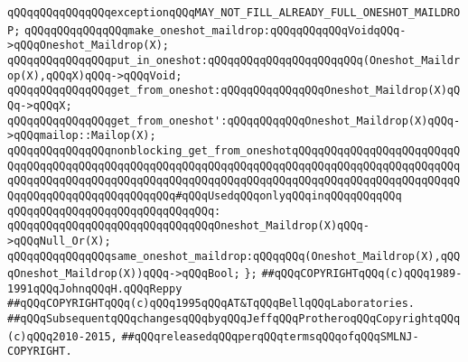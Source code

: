 \newline
\verb|qQQqqQQqqQQqqQQqexceptionqQQqMAY_NOT_FILL_ALREADY_FULL_ONESHOT_MAILDROP;|\newline
\newline
\verb|qQQqqQQqqQQqqQQqmake_oneshot_maildrop:qQQqqQQqqQQqVoidqQQq->qQQqOneshot_Maildrop(X);|\newline
\newline
\verb|qQQqqQQqqQQqqQQqput_in_oneshot:qQQqqQQqqQQqqQQqqQQqqQQq(Oneshot_Maildrop(X),qQQqX)qQQq->qQQqVoid;|\newline
\verb|qQQqqQQqqQQqqQQqget_from_oneshot:qQQqqQQqqQQqqQQqOneshot_Maildrop(X)qQQq->qQQqX;|\newline
\verb|qQQqqQQqqQQqqQQqget_from_oneshot':qQQqqQQqqQQqOneshot_Maildrop(X)qQQq->qQQqmailop::Mailop(X);|\newline
\newline
\verb|qQQqqQQqqQQqqQQqnonblocking_get_from_oneshotqQQqqQQqqQQqqQQqqQQqqQQqqQQqqQQqqQQqqQQqqQQqqQQqqQQqqQQqqQQqqQQqqQQqqQQqqQQqqQQqqQQqqQQqqQQqqQQqqQQqqQQqqQQqqQQqqQQqqQQqqQQqqQQqqQQqqQQqqQQqqQQqqQQqqQQqqQQqqQQqqQQqqQQqqQQqqQQqqQQqqQQqqQQqqQQq#qQQqUsedqQQqonlyqQQqinqQQqqQQqqQQq|\newline
\verb|qQQqqQQqqQQqqQQqqQQqqQQqqQQqqQQq:|\newline
\verb|qQQqqQQqqQQqqQQqqQQqqQQqqQQqqQQqOneshot_Maildrop(X)qQQq->qQQqNull_Or(X);|\newline
\newline
\verb|qQQqqQQqqQQqqQQqsame_oneshot_maildrop:qQQqqQQq(Oneshot_Maildrop(X),qQQqOneshot_Maildrop(X))qQQq->qQQqBool;|\newline
\newline
\verb|};|\newline
\newline
\newline
\verb|##qQQqCOPYRIGHTqQQq(c)qQQq1989-1991qQQqJohnqQQqH.qQQqReppy|\newline
\verb|##qQQqCOPYRIGHTqQQq(c)qQQq1995qQQqAT&TqQQqBellqQQqLaboratories.|\newline
\verb|##qQQqSubsequentqQQqchangesqQQqbyqQQqJeffqQQqProtheroqQQqCopyrightqQQq(c)qQQq2010-2015,|\newline
\verb|##qQQqreleasedqQQqperqQQqtermsqQQqofqQQqSMLNJ-COPYRIGHT.|\newline

